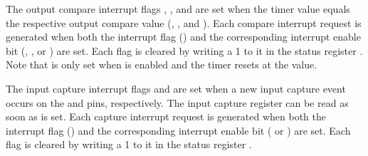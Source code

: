 The output compare interrupt flags , , and  are set when the timer value equals the respective output compare value (, , and ). Each compare interrupt request is generated when both the interrupt flag () and the corresponding interrupt enable bit (, , or ) are set. Each  flag is cleared by writing a 1 to it in the status register . Note that  is only set when  is enabled and the timer resets at the  value.

The input capture interrupt flags  and  are set when a new input capture event occurs on the  and  pins, respectively. The input capture register  can be read as soon as  is set. Each capture interrupt request is generated when both the interrupt flag () and the corresponding interrupt enable bit ( or ) are set. Each  flag is cleared by writing a 1 to it in the status register .
